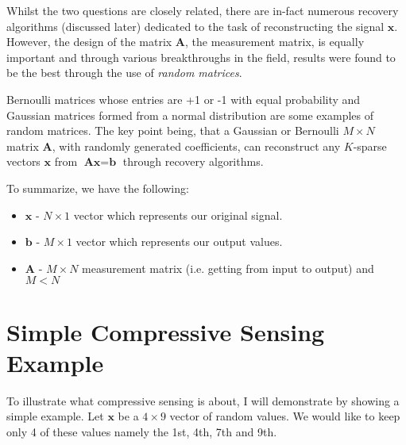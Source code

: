 \documentclass[titlepage,oneside, 12pt]{book}
\theoremstyle{break}
\begin{document}
Whilst the two questions are closely related, there are in-fact numerous recovery algorithms (discussed later) dedicated to the task of reconstructing the signal $\textbf{x}$. However, the design of the matrix $\textbf{A}$, the measurement matrix, is equally important and through various breakthroughs in the field, results were found to be the best through the use of \textit{random matrices}.

Bernoulli matrices whose entries are +1 or -1 with equal probability and Gaussian matrices formed from a normal distribution are some examples of random matrices. The key point being, that a Gaussian or Bernoulli $M \times N$ matrix $\textbf{A}$, with randomly generated coefficients, can reconstruct any $K$-sparse vectors $\textbf{x}$ from {$\textbf{Ax}=\textbf{b}$} through recovery algorithms. 

\newpage

To summarize, we have the following:
\begin{itemize}
\item $\textbf{x}$ - $N \times 1$ vector which represents our original signal. 
\item $\textbf{b}$ - $M \times 1$ vector which represents our output values.
\item $\textbf{A}$ - $M \times N$ measurement matrix (i.e. getting from input to output) and $M < N$
\end{itemize}

\newpage
 
\section{Simple Compressive Sensing Example}

To illustrate what compressive sensing is about, I will demonstrate by showing a simple example. Let $\textbf{x}$ 
be a $4 \times 9$ vector of random values. We would like to keep only 4 of these values namely the 1st, 4th, 7th and 9th.
\end{document}

